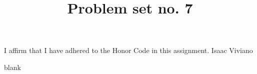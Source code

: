 \documentclass[12pt, reqno]{amsart}
\theoremstyle{definition}
\theoremstyle{remark}
\begin{document}
\title[Math 357 - Harmonic Analysis]{Problem set no. 7 }

\begin{titlepage}
    
\maketitle

I affirm that I have adhered to the Honor Code in this assignment. Isaac Viviano
\end{titlepage}

blank
\newpage

\section*{}






\end{document}
